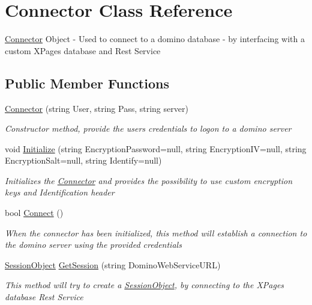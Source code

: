 \hypertarget{class_connector}{}\section{Connector Class Reference}
\label{class_connector}


\hyperlink{class_connector}{Connector} Object -\/ Used to connect to a domino database -\/ by interfacing with a custom X\+Pages database and Rest Service  


\subsection*{Public Member Functions}
\begin{DoxyCompactItemize}
\item 
\hyperlink{class_connector_a259c6d94252479cc3028038ebbaa7dc8}{Connector} (string User, string Pass, string server)
\begin{DoxyCompactList}\small\item\em Constructor method, provide the users credentials to logon to a domino server \end{DoxyCompactList}\item 
void \hyperlink{class_connector_a2ceb19719cfc04adc4c2d299e19e1447}{Initialize} (string Encryption\+Password=null, string Encryption\+IV=null, string Encryption\+Salt=null, string Identify=null)
\begin{DoxyCompactList}\small\item\em Initializes the \hyperlink{class_connector}{Connector} and provides the possibility to use custom encryption keys and Identification header \end{DoxyCompactList}\item 
bool \hyperlink{class_connector_a0dcf8f969c37c4306c567417a872329a}{Connect} ()
\begin{DoxyCompactList}\small\item\em When the connector has been initialized, this method will establish a connection to the domino server using the provided credentials \end{DoxyCompactList}\item 
\hyperlink{class_session_object}{Session\+Object} \hyperlink{class_connector_a5d089c1639f255966f00b2b05add0993}{Get\+Session} (string Domino\+Web\+Service\+U\+RL)
\begin{DoxyCompactList}\small\item\em This method will try to create a \hyperlink{class_session_object}{Session\+Object}, by connecting to the X\+Pages database Rest Service \end{DoxyCompactList}\end{DoxyCompactItemize}
